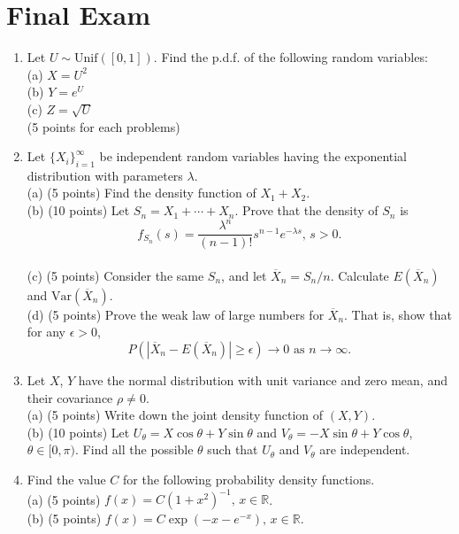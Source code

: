 \documentclass[14pt]{extarticle}
\begin{document}
\section*{Final Exam}
\begin{enumerate}
    \item Let $U\sim\text{Unif}([0,1])$. Find the p.d.f. of the following random variables:\\
    (a) $X=U^2$\\
    (b) $Y=e^U$\\
    (c) $Z=\sqrt{U}$\\
    (5 points for each problems)
    
    \item Let $\{X_i\}_{i=1}^\infty$ be independent random variables having the exponential distribution with parameters $\lambda$.\\
    (a) (5 points) Find the density function of $X_1+X_2$.\\
    (b) (10 points) Let $S_n=X_1+\cdots+X_n$. Prove that the density of $S_n$ is
    \begin{equation*}
    f_{S_n}(s)=\frac{\lambda^n}{(n-1)!}s^{n-1}e^{-\lambda s},\,s>0.
    \end{equation*}\\
    (c) (5 points) Consider the same $S_n$, and let $\overline{X}_n=S_n/n$. Calculate $E(\overline{X}_n)$ and $\text{Var}(\overline{X}_n)$.\\
    (d) (5 points) Prove the weak law of large numbers for $\overline{X}_n$. That is, show that for any $\epsilon>0$,
    \begin{equation*}    
    P(|\overline{X}_n-E(\overline{X}_n)|\geq\epsilon)\rightarrow 0\text{ as }n\rightarrow\infty.
    \end{equation*}
    
    \item Let $X$, $Y$ have the normal distribution with unit variance and zero mean, and their covariance $\rho\neq 0$.\\
    (a) (5 points) Write down the joint density function of $(X,Y)$.\\
    (b) (10 points) Let $U_\theta=X\cos\theta+Y\sin\theta$ and $V_\theta=-X\sin\theta+Y\cos\theta$, $\theta\in[0,\pi)$. Find all the possible $\theta$ such that $U_\theta$ and $V_\theta$ are independent.
    
    \item Find the value $C$ for the following probability density functions.\\
    (a) (5 points) $f(x)=C(1+x^2)^{-1},\,x\in\mathbb{R}$. \\
    (b) (5 points) $f(x)=C\exp(-x-e^{-x}),\,x\in\mathbb{R}$.


\end{enumerate}
\end{document}
